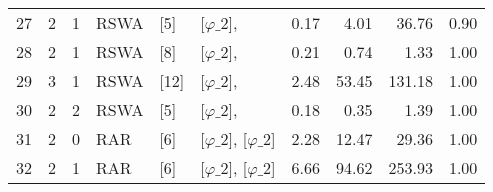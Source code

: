 \begin{tabular}{lrrlllrrrr}
    27 & 2     & 1     & RSWA        & [5]     & [$\varphi\_{2}$],                            & 0.17                    & 4.01   & 36.76  & 0.90 \\
    28 & 2     & 1     & RSWA        & [8]     & [$\varphi\_{2}$],                            & 0.21                    & 0.74   & 1.33   & 1.00 \\
    29 & 3     & 1     & RSWA        & [12]    & [$\varphi\_{2}$],                            & 2.48                    & 53.45  & 131.18 & 1.00 \\
    30 & 2     & 2     & RSWA        & [5]     & [$\varphi\_{2}$],                            & 0.18                    & 0.35   & 1.39   & 1.00 \\
    31 & 2     & 0     & RAR         & [6]     & [$\varphi\_{2}$], [$\varphi\_{2}$]           & 2.28                    & 12.47  & 29.36  & 1.00 \\
    32 & 2     & 1     & RAR         & [6]     & [$\varphi\_{2}$], [$\varphi\_{2}$]           & 6.66                    & 94.62  & 253.93 & 1.00 \\
    \bottomrule
\end{tabular}
